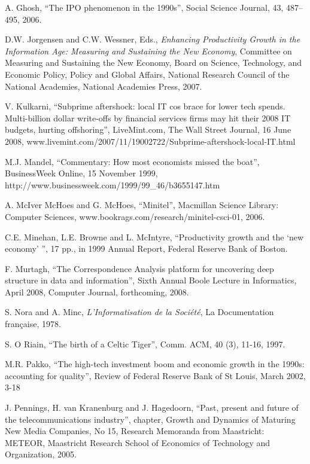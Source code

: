 \documentclass{article}
\begin{document}
\begin{thebibliography}{99.}
A. Ghosh, ``The IPO phenomenon in the 1990s'', Social Science Journal,
43, 487--495, 2006.  

D.W. Jorgensen and C.W. Wessner, Eds., 
{\em Enhancing Productivity Growth in the Information Age: 
Measuring and Sustaining the New Economy},
Committee on Measuring and Sustaining the New Economy, 
Board on Science, Technology, and Economic Policy, 
Policy and Global Affairs,
National Research Council of the National Academies,
National Academies Press, 2007.




V. Kulkarni, ``Subprime aftershock: local IT cos brace for lower
tech spends.  Multi-billion dollar write-offs by financial services
firms may hit their 2008 IT budgets, hurting offshoring'', 
LiveMint.com, The Wall Street Journal, 16 June 2008,
www.livemint.com/2007/11/19002722/Subprime-aftershock-local-IT.html

M.J. Mandel, ``Commentary: How most economists missed the boat'', 
BusinessWeek Online, 15 November 1999,
http://www.businessweek.com/1999/99\_46/b3655147.htm



A. McIver McHoes and G. McHoes, ``Minitel'', Macmillan Science 
Library: Computer Sciences, 
www.bookrags.com/research/minitel-csci-01, 2006.  

C.E. Minehan, L.E. Browne and L. McIntyre, ``Productivity growth 
and the `new economy' '', 17 pp., in 1999 Annual Report, Federal Reserve
Bank of Boston.  



F. Murtagh, ``The Correspondence Analysis platform for uncovering 
deep structure in data and information'', Sixth Annual Boole Lecture in 
Informatics, April 2008, Computer Journal, forthcoming, 2008.  



S. Nora and A. Minc, {\em L'Informatisation de la Soci\'et\'e},
La Documentation fran\c{c}aise, 1978.

S. O Riain, ``The birth of a Celtic Tiger'', Comm. ACM, 40 (3), 11-16,
1997.


M.R. Pakko, ``The high-tech investment boom and economic growth in the 
1990s: accounting for quality'', Review of Federal Reserve Bank of 
St Louis, March 2002, 3-18


J. Pennings, H. van Kranenburg and J. Hagedoorn, ``Past, present and future
of the telecommunications industry'', chapter, 
Growth and Dynamics of Maturing New Media Companies, 
No 15, Research Memoranda from Maastricht: METEOR, 
Maastricht Research School of Economics of Technology and Organization,
2005.


\end{thebibliography}
\end{document}
